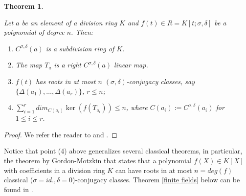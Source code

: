 \documentclass{amsproc}
\newtheorem{theorem}{Theorem}[section]
\newcommand{\de}{\delta}
\newcommand{\si}{\sigma}
\numberwithin{equation}{section}
\begin{document}
\begin{theorem}
	\label{generalization of Gordon-Motzkin}
	
	Let $a$ be an element of a division ring $K$ and $f(t)\in R=K[t;\sigma,\delta]$ be a polynomial of degree $n$.
	Then:
	\begin{enumerate}
		\item[(1)] $C^{\si,\de}(a)$ is a subdivision ring of $K$.
		\item[(2)] The map $T_a$ is a right $C^{\si,\de}(a)$ linear map.
		\item[(3)] $f(t)$ has roots in at most $n$ $(\sigma,
		\delta)$-conjugacy classes, say $\{\Delta
		(a_1),\dots,\Delta(a_r)\}$, $r\le n$;
		\item[(4)] $\sum_{i=1}^rdim_{C(a_i)}\ker (f(T_{a_i}))\le n$, where 
		$C(a_i):=C^{\si,\de}(a_i)$ for $1\le i \le r$.
	\end{enumerate}
\end{theorem}
\begin{proof}
	We refer the reader to \cite{LLO} and \cite{LO}.
\end{proof}

Notice that point (4) above generalizes several classical theorems, in particular, the theorem by Gordon-Motzkin that states that a polynomial $f(X)\in K[X]$ with coefficients in a division ring $K$ can have roots in at most
$n=deg (f)$ classical ($\si=id., \de=0$)-conjugacy classes.   
Theorem \ref{finite fields} below can be found in \cite{L2}.
\end{document}
